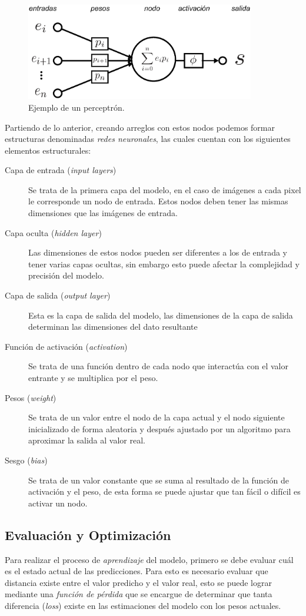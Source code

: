 \begin{figure}[b]
    \includegraphics[width=100mm]{Figuras/neural_network.eps}
    \centering
    \caption{Ejemplo de un perceptrón.}
    \label{fig:percep}
\end{figure}

Partiendo de lo anterior, creando arreglos con estos nodos podemos formar estructuras denominadas \emph{redes neuronales}, las cuales cuentan con los siguientes elementos estructurales:

\begin{description}
    \item[Capa de entrada (\emph{input layers})] { Se trata de la primera capa del modelo, en el caso de imágenes a cada pixel le corresponde un nodo de entrada. Estos nodos deben tener las mismas dimensiones que las imágenes de entrada.}
    \item[Capa oculta (\emph{hidden layer})] {Las dimensiones de estos nodos pueden ser diferentes a los de entrada y tener varias capas ocultas, sin embargo esto puede afectar la complejidad y precisión del modelo.} 
    \item[Capa de salida (\emph{output layer})]  {Esta es la capa de salida del modelo, las dimensiones de la capa de salida determinan las dimensiones del dato resultante}
    \item[Función de activación (\emph{activation})]{Se trata de una función dentro de cada nodo que interactúa con el valor entrante y se multiplica por el peso.}
    \item[Pesos (\emph{weight})] {Se trata de un valor entre el nodo de la capa actual y el nodo siguiente inicializado de forma aleatoria y después ajustado por un algoritmo para aproximar la salida al valor real.}  
    \item[Sesgo (\emph{bias})] {Se trata de un valor constante que se suma al resultado de la función de activación y el peso, de esta forma se puede ajustar que tan fácil o difícil es activar un nodo.} 
\end{description}

\subsection{Evaluación y Optimización}
Para realizar el proceso de \emph{aprendizaje} del modelo, primero se debe evaluar cuál es el estado actual de las predicciones. Para esto es necesario evaluar que distancia existe entre el valor predicho y el valor real, esto se puede lograr mediante una \emph{función de pérdida} que se encargue de determinar que tanta diferencia (\emph{loss}) existe en las estimaciones del modelo con los pesos actuales.

